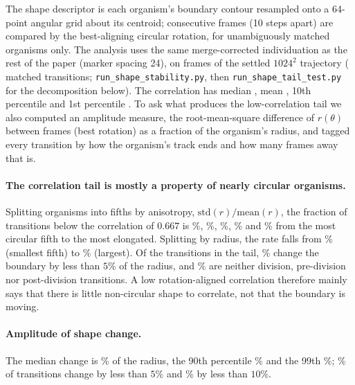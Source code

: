 \documentclass[11pt]{article}
\begin{document}
The shape descriptor is each organism's boundary contour resampled onto a 64-point angular grid about its centroid; consecutive frames (10 steps apart) are compared by the best-aligning circular rotation, for unambiguously matched organisms only. The analysis uses the same merge-corrected individuation as the rest of the paper (marker spacing 24), on \nn{\FramesShapeTail} frames of the settled $1024^2$ trajectory (\nn{\ShapeN} matched transitions; \texttt{run\_shape\_stability.py}, then \texttt{run\_shape\_tail\_test.py} for the decomposition below). The correlation has median , mean , 10th percentile  and 1st percentile . To ask what produces the low-correlation tail we also computed an amplitude measure, the root-mean-square difference of $r(\theta)$ between frames (best rotation) as a fraction of the organism's radius, and tagged every transition by how the organism's track ends and how many frames away that is.

\paragraph{The correlation tail is mostly a property of nearly circular organisms.} Splitting organisms into fifths by anisotropy, $\mathrm{std}(r)/\mathrm{mean}(r)$, the fraction of transitions below the correlation of $0.667$ is \%, \%, \%, \% and \% from the most circular fifth to the most elongated. Splitting by radius, the rate falls from \% (smallest fifth) to \% (largest). Of the transitions in the tail, \% change the boundary by less than $5\%$ of the radius, and \% are neither division, pre-division nor post-division transitions. A low rotation-aligned correlation therefore mainly says that there is little non-circular shape to correlate, not that the boundary is moving.

\paragraph{Amplitude of shape change.} The median change is \% of the radius, the 90th percentile \% and the 99th \%; \% of transitions change by less than $5\%$ and \% by less than $10\%$.
\end{document}
